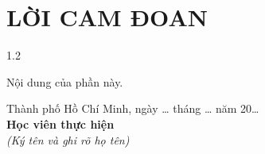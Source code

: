
{}
\chapter*{LỜI CAM ĐOAN}

\begin{spacing}{1.2}

Nội dung của phần này.

\end{spacing}

\vspace{1.5cm}
\begin{flushright}
\begin{minipage}{10.5cm}
\centering
Thành phố Hồ Chí Minh, ngày \ldots{} tháng \ldots{} năm 20\ldots\\[0.2cm]
\textbf{Học viên thực hiện}\\
\textit{(Ký tên và ghi rõ họ tên)}
\vspace{2.5cm}
\end{minipage}
\end{flushright}

\clearpage
